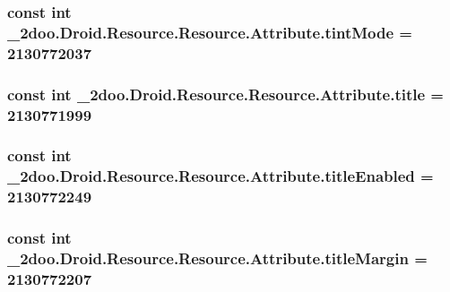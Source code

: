 \hypertarget{class__2doo_1_1_droid_1_1_resource_1_1_attribute_212dde6e9cdaec5a7901a4207ee6af1a}{
\subsubsection[{tintMode}]{\setlength{\rightskip}{0pt plus 5cm}const int \_\-2doo.Droid.Resource.Resource.Attribute.tintMode = 2130772037}}
\label{class__2doo_1_1_droid_1_1_resource_1_1_attribute_212dde6e9cdaec5a7901a4207ee6af1a}


\hypertarget{class__2doo_1_1_droid_1_1_resource_1_1_attribute_bb3c22ed61e913c53f7cc478173c5b74}{
\subsubsection[{title}]{\setlength{\rightskip}{0pt plus 5cm}const int \_\-2doo.Droid.Resource.Resource.Attribute.title = 2130771999}}
\label{class__2doo_1_1_droid_1_1_resource_1_1_attribute_bb3c22ed61e913c53f7cc478173c5b74}


\hypertarget{class__2doo_1_1_droid_1_1_resource_1_1_attribute_c6c5b6bc2e83a1258382c4afa60edb51}{
\subsubsection[{titleEnabled}]{\setlength{\rightskip}{0pt plus 5cm}const int \_\-2doo.Droid.Resource.Resource.Attribute.titleEnabled = 2130772249}}
\label{class__2doo_1_1_droid_1_1_resource_1_1_attribute_c6c5b6bc2e83a1258382c4afa60edb51}


\hypertarget{class__2doo_1_1_droid_1_1_resource_1_1_attribute_6040c6dc4b777edf723609c908da8a76}{
\subsubsection[{titleMargin}]{\setlength{\rightskip}{0pt plus 5cm}const int \_\-2doo.Droid.Resource.Resource.Attribute.titleMargin = 2130772207}}
\label{class__2doo_1_1_droid_1_1_resource_1_1_attribute_6040c6dc4b777edf723609c908da8a76}


